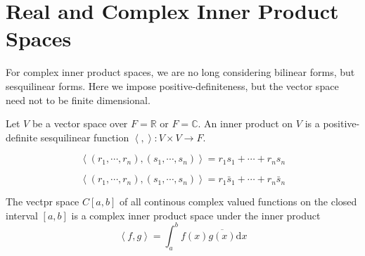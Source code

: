 \section{Real and Complex Inner Product Spaces}
For complex inner product spaces, we are no long considering bilinear forms, but sesquilinear forms. Here we impose positive-definiteness, but the vector space need not to be finite dimensional.
\begin{definition}
Let $V$ be a vector space over $F=\mathbb{R}$ or $F=\mathbb{C}$. An inner product on $V$ is a positive-definite sesquilinear function $\left \langle , \right \rangle :V\times V\longrightarrow F$.


\end{definition}

\begin{example}
\begin{equation*}
\left \langle (r_1,\cdots,r_n),(s_1,\cdots,s_n) \right \rangle=r_1s_1+\cdots+r_ns_n
\end{equation*}
\end{example}
\begin{example}
\begin{equation*}
\left \langle (r_1,\cdots,r_n),(s_1,\cdots,s_n) \right \rangle=r_1\bar{s}_1+\cdots+r_n\bar{s}_n
\end{equation*}
\end{example}
\begin{example}
The vectpr space $C[a,b]$ of all continous complex valued functions on the closed interval $[a,b]$ is a complex inner product space under the inner product 
\begin{equation*}
\left \langle f,g\right \rangle =\int_a^bf(x)\overline{g(x)}\mathrm{d}x
\end{equation*}
\end{example}

